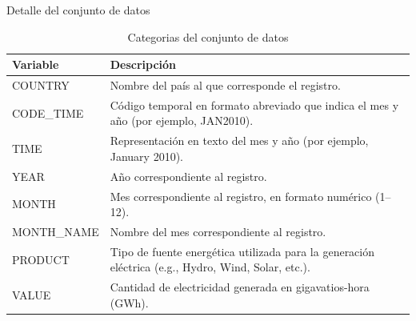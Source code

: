 \documentclass[10pt]{beamer}
\begin{document}
	\begin{frame}[fragile]{Detalle del conjunto de datos}
\begin{table}[h!]
	\begin{tabular}{|l|p{7cm}|}
		\hline
		\textbf{Variable}  & \textbf{Descripción}                                                                                                    \\ \hline
		COUNTRY            & Nombre del país al que corresponde el registro.                                                                         \\ \hline
		CODE\_TIME         & Código temporal en formato abreviado que indica el mes y año (por ejemplo, JAN2010).                                    \\ \hline
		TIME               & Representación en texto del mes y año (por ejemplo, January 2010).                                                      \\ \hline
		YEAR               & Año correspondiente al registro.                                                                                        \\ \hline
		MONTH              & Mes correspondiente al registro, en formato numérico (1–12).                                                            \\ \hline
		MONTH\_NAME        & Nombre del mes correspondiente al registro.                                                                             \\ \hline
		PRODUCT            & Tipo de fuente energética utilizada para la generación eléctrica (e.g., Hydro, Wind, Solar, etc.).                      \\ \hline
		VALUE              & Cantidad de electricidad generada en gigavatios-hora (GWh).                                                             \\ \hline		
	\end{tabular}
	\caption{Categorias del conjunto de datos}\label{table:tab1}
\end{table}	
	\end{frame}
	
\end{document}

